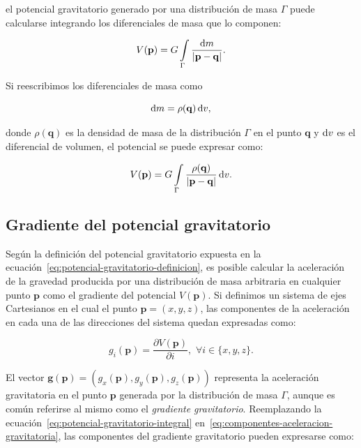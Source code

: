 \noindent el potencial gravitatorio generado por una distribución de masa
$\Gamma$ puede calcularse integrando los diferenciales de masa que lo componen:

\begin{equation}
    V(\mathbf{p}) =
        G \int\limits_\Gamma \frac{\mathop{}\!\textnormal{d} m}{|\mathbf{p} - \mathbf{q}|} .
\end{equation}

Si reescribimos los diferenciales de masa como

\begin{equation}
    \mathop{}\!\textnormal{d} m = \rho(\mathbf{q}) \mathop{}\!\textnormal{d} v,
\end{equation}

\noindent donde $\rho(\mathbf{q})$ es la densidad de masa de la distribución
$\Gamma$ en el punto $\mathbf{q}$ y $\mathop{}\!\textnormal{d} v$ es el diferencial de volumen,
el potencial se puede expresar como:

\begin{equation}
    V(\mathbf{p}) =
        G \int\limits_\Gamma
        \frac{\rho(\mathbf{q})}{|\mathbf{p} - \mathbf{q}|} \mathop{}\!\textnormal{d} v.
    \label{eq:potencial-gravitatorio-integral}
\end{equation}


\subsection{Gradiente del potencial gravitatorio}

Según la definición del potencial gravitatorio expuesta en la
ecuación~\ref{eq:potencial-gravitatorio-definicion}, es posible calcular la
aceleración de la gravedad producida por una distribución de masa arbitraria
en cualquier punto $\mathbf{p}$ como el gradiente del potencial
$V(\mathbf{p})$.
Si definimos un sistema de ejes Cartesianos en el cual el punto $\mathbf{p}
= (x, y, z)$, las componentes de la aceleración en cada una de las direcciones
del sistema quedan expresadas
como:

\begin{equation}
    g_i(\mathbf{p}) = \frac{\partial V(\mathbf{p})}{\partial i}, \,\,
        \forall i \in \{x, y, z\}.
    \label{eq:componentes-aceleracion-gravitatoria}
\end{equation}

El vector
$\mathbf{g}(\mathbf{p}) = (g_x(\mathbf{p}), g_y(\mathbf{p}), g_z(\mathbf{p}))$
representa la aceleración gravitatoria en el punto
$\mathbf{p}$ generada por la distribución de masa $\Gamma$, aunque es común
referirse al mismo como el \emph{gradiente gravitatorio}.
Reemplazando la ecuación~\ref{eq:potencial-gravitatorio-integral}
en~\ref{eq:componentes-aceleracion-gravitatoria}, las componentes del gradiente
gravitatorio pueden expresarse como:

